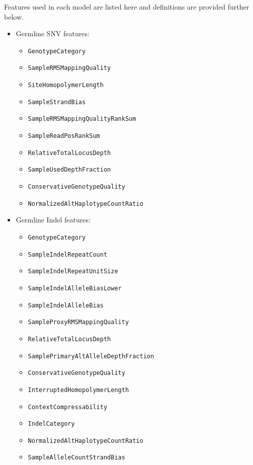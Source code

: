 \documentclass{article}
\begin{document}
Features used in each model are listed here and definitions are provided further below.

\begin{itemize}
    \item Germline SNV features:
    \begin{itemize}
        \item \texttt{GenotypeCategory}
        \item \texttt{SampleRMSMappingQuality}
        \item \texttt{SiteHomopolymerLength}
        \item \texttt{SampleStrandBias}
        \item \texttt{SampleRMSMappingQualityRankSum}
        \item \texttt{SampleReadPosRankSum}
        \item \texttt{RelativeTotalLocusDepth}
        \item \texttt{SampleUsedDepthFraction}
        \item \texttt{ConservativeGenotypeQuality}
        \item \texttt{NormalizedAltHaplotypeCountRatio}
    \end{itemize}
    \item Germline Indel features:
    \begin{itemize}
        \item \texttt{GenotypeCategory}
        \item \texttt{SampleIndelRepeatCount}
        \item \texttt{SampleIndelRepeatUnitSize}
        \item \texttt{SampleIndelAlleleBiasLower}
        \item \texttt{SampleIndelAlleleBias}
        \item \texttt{SampleProxyRMSMappingQuality}
        \item \texttt{RelativeTotalLocusDepth}
        \item \texttt{SamplePrimaryAltAlleleDepthFraction}
        \item \texttt{ConservativeGenotypeQuality}
        \item \texttt{InterruptedHomopolymerLength}
        \item \texttt{ContextCompressability}
        \item \texttt{IndelCategory}
        \item \texttt{NormalizedAltHaplotypeCountRatio}
        \item \texttt{SampleAlleleCountStrandBias}
    \end{itemize}


\end{itemize}
\end{document}
